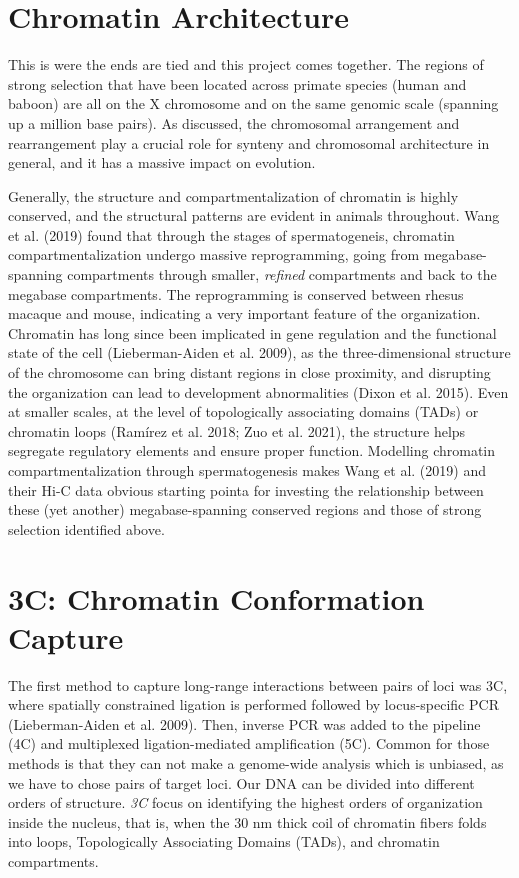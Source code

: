 \documentclass[
  11pt,
  a4paper,
]{scrbook}
\let\oldemph\emph
\renewcommand\emph[1]{\oldemph{\color{gray}#1}}
\begin{document}
\section{Chromatin Architecture}\label{chromatin-architecture}

This is were the ends are tied and this project comes together. The
regions of strong selection that have been located across primate
species (human and baboon) are all on the X chromosome and on the same
genomic scale (spanning up a million base pairs). As discussed, the
chromosomal arrangement and rearrangement play a crucial role for
synteny and chromosomal architecture in general, and it has a massive
impact on evolution.

Generally, the structure and compartmentalization of chromatin is highly
conserved, and the structural patterns are evident in animals
throughout. Wang et al. (2019) found that through the stages of
spermatogeneis, chromatin compartmentalization undergo massive
reprogramming, going from megabase-spanning compartments through
smaller, \emph{refined} compartments and back to the megabase
compartments. The reprogramming is conserved between rhesus macaque and
mouse, indicating a very important feature of the organization.
Chromatin has long since been implicated in gene regulation and the
functional state of the cell (Lieberman-Aiden et al. 2009), as the
three-dimensional structure of the chromosome can bring distant regions
in close proximity, and disrupting the organization can lead to
development abnormalities (Dixon et al. 2015). Even at smaller scales,
at the level of topologically associating domains (TADs) or chromatin
loops (Ramírez et al. 2018; Zuo et al. 2021), the structure helps
segregate regulatory elements and ensure proper function. Modelling
chromatin compartmentalization through spermatogenesis makes Wang et al.
(2019) and their Hi-C data obvious starting pointa for investing the
relationship between these (yet another) megabase-spanning conserved
regions and those of strong selection identified above.

\section{3C: Chromatin Conformation
Capture}\label{c-chromatin-conformation-capture}

The first method to capture long-range interactions between pairs of
loci was 3C, where spatially constrained ligation is performed followed
by locus-specific PCR (Lieberman-Aiden et al. 2009). Then, inverse PCR
was added to the pipeline (4C) and multiplexed ligation-mediated
amplification (5C). Common for those methods is that they can not make a
genome-wide analysis which is unbiased, as we have to chose pairs of
target loci. Our DNA can be divided into different orders of structure.
\emph{3C} focus on identifying the highest orders of organization inside
the nucleus, that is, when the 30 nm thick coil of chromatin fibers
folds into loops, Topologically Associating Domains (TADs), and
chromatin compartments.
\end{document}
